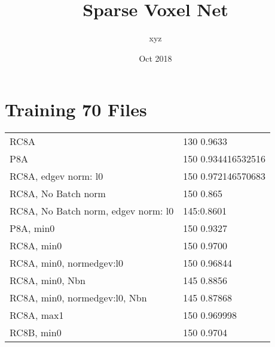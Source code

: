 \documentclass[,table,dvipsnames]{article}
\title{Sparse Voxel Net}
\author{xyz}
\date{Oct 2018}
\begin{document}
	
\noindent
\begin{titlepage}
	\maketitle
\end{titlepage}	

\section{Training 70 Files}
\noindent\begin{tabular}{|p{10cm}|p{5.5cm}| }	
\hline \hline
\rowcolor{green!20}
RC8A  & 130 0.9633 \\
P8A & 150 0.934416532516 \\
RC8A,  edgev norm: l0 & 150 0.972146570683 \\
RC8A, No Batch norm  & 150 0.865 \\
RC8A, No Batch norm,  edgev norm: l0  & 145:0.8601 \\
 \hline 	
P8A, min0  & 150 0.9327 \\
RC8A, min0  & 150 0.9700 \\
RC8A, min0, normedgev:l0  & 150 0.96844 \\
RC8A, min0, Nbn & 145 0.8856 \\
RC8A, min0, normedgev:l0, Nbn  & 145 0.87868 \\
 \hline
RC8A, max1  & 150 0.969998 \\
 \hline 
RC8B, min0  & 150 0.9704 \\
 \hline 
\end{tabular}
 
\end{document}

